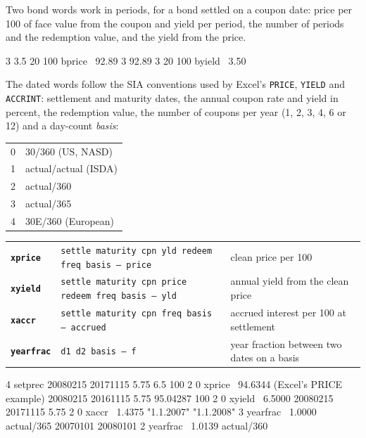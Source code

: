 \documentclass[11pt,letterpaper]{article}
\newcommand{\code}[1]{\texttt{#1}}
\newcommand{\cmd}[1]{\texttt{\textbf{#1}}}
\newcommand{\stk}[1]{\texttt{#1}}
\begin{document}
Two bond words work in periods, for a bond settled on a coupon date: price per 100 of face value from the coupon and yield per period, the number of periods and the redemption value, and the yield from the price.
\begin{rpn}
3 3.5 20 100 bprice     \ 92.89   3%
92.89 3 20 100 byield   \ 3.50
\end{rpn}
The dated words follow the SIA conventions used by Excel's \code{PRICE}, \code{YIELD} and \code{ACCRINT}: settlement and maturity dates, the annual coupon rate and yield in percent, the redemption value, the number of coupons per year (1, 2, 3, 4, 6 or 12) and a day-count \emph{basis}:
\begin{center}
\begin{tabular}{@{}cl@{}}
\toprule
0 & 30/360 (US, NASD) \\
1 & actual/actual (ISDA) \\
2 & actual/360 \\
3 & actual/365 \\
4 & 30E/360 (European) \\
\bottomrule
\end{tabular}
\end{center}
\begin{center}
\begin{tabular}{@{}lp{}p{}@{}}
\toprule
\cmd{xprice} & \stk{settle maturity cpn yld redeem freq basis -- price} & clean price per 100 \\
\cmd{xyield} & \stk{settle maturity cpn price redeem freq basis -- yld} & annual yield from the clean price \\
\cmd{xaccr}  & \stk{settle maturity cpn freq basis -- accrued} & accrued interest per 100 at settlement \\
\cmd{yearfrac} & \stk{d1 d2 basis -- f} & year fraction between two dates on a basis \\
\bottomrule
\end{tabular}
\end{center}
\begin{rpn}
4 setprec
20080215 20171115 5.75 6.5 100 2 0 xprice        \ 94.6344   (Excel's PRICE example)
20080215 20161115 5.75 95.04287 100 2 0 xyield   \ 6.5000
20080215 20171115 5.75 2 0 xaccr                 \ 1.4375
"1.1.2007" "1.1.2008" 3 yearfrac                 \ 1.0000    actual/365
20070101 20080101 2 yearfrac                     \ 1.0139    actual/360
\end{rpn}
\end{document}
